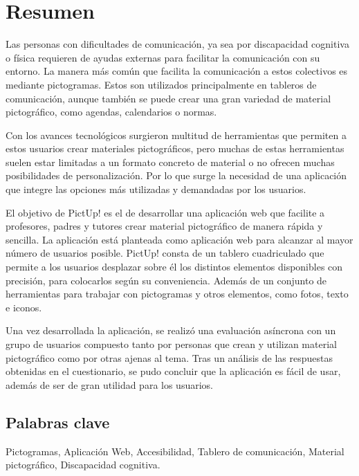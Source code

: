 \chapter*{Resumen}

Las personas con dificultades de comunicación, ya sea por discapacidad cognitiva o física requieren de ayudas externas para facilitar la comunicación con su entorno. La manera más común que facilita la comunicación a estos colectivos es mediante  pictogramas. Estos son utilizados principalmente en tableros de comunicación, aunque también se puede crear una gran variedad de material pictográfico, como agendas, calendarios o normas.

Con los avances tecnológicos surgieron multitud de herramientas que permiten a estos usuarios crear materiales pictográficos, pero muchas de estas herramientas suelen estar limitadas a un formato concreto de material o no ofrecen muchas posibilidades de personalización. Por lo que surge la necesidad de una aplicación que integre las opciones más utilizadas y demandadas por los usuarios. 

El objetivo de PictUp! es el de desarrollar una aplicación web que facilite a profesores, padres y tutores crear material pictográfico de manera rápida y sencilla. La aplicación está planteada como aplicación web para alcanzar al mayor número de usuarios posible. PictUp! consta de un tablero cuadriculado que permite a los usuarios desplazar sobre él los distintos elementos disponibles con precisión, para colocarlos según su conveniencia. Además de un conjunto de herramientas para trabajar con pictogramas y otros elementos, como fotos, texto e iconos.

Una vez desarrollada la aplicación, se realizó una evaluación asíncrona con un grupo de usuarios compuesto tanto por personas que crean y utilizan material pictográfico como por otras ajenas al tema. Tras un análisis de las respuestas obtenidas en el cuestionario, se pudo concluir que la aplicación es fácil de usar, además de ser de gran utilidad para los usuarios.


\section*{Palabras clave}
   
\noindent Pictogramas, Aplicación Web, Accesibilidad, Tablero de comunicación, Material pictográfico, Discapacidad cognitiva. 

   


